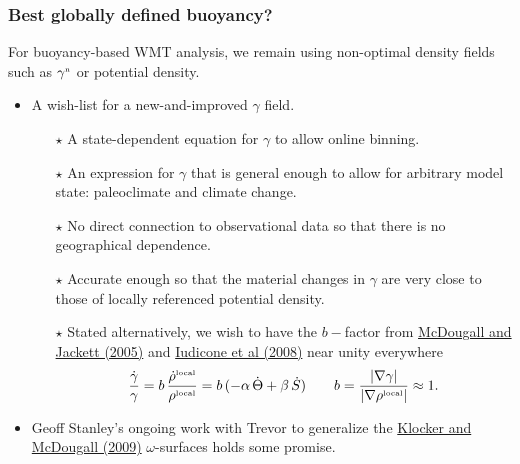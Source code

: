 \documentclass[10pt]{beamer}
\begin{document}
\begin{frame}
  \frametitle{Best globally defined buoyancy?}

  For buoyancy-based WMT analysis, we remain using non-optimal density
  fields such as $\gamma^{\mbox{\tiny n}}$ or potential density.

\begin{exampleblock}{}
\begin{itemize}

\item A wish-list for a new-and-improved $\gamma$ field.


\begin{itemize}  \footnotesize 
\item[$\star$] A state-dependent equation for $\gamma$ to allow online
  binning.

\item[$\star$] An expression for $\gamma$ that is general enough to
  allow for arbitrary model state: paleoclimate and climate change.

\item[$\star$] No direct connection to observational data so that
  there is no geographical dependence.

\item[$\star$] Accurate enough so that the material changes in
  $\gamma$ are very close to those of locally referenced potential
  density. 

\item[$\star$] Stated alternatively, we wish to have the $b-$factor
  from \href{https://doi.org/10.1357/0022240053693734}{McDougall and
    Jackett (2005)} and
  \href{https://journals.ametsoc.org/doi/10.1175/2007JPO3464.1}{Iudicone
    et al (2008)} near unity everywhere
\begin{equation}
   \frac{\dot{\gamma}}{\gamma} = b \, \frac{\dot{\rho}^{\mbox{\tiny local}}}{\rho^{\mbox{\tiny local}} }
   = b \, (-\alpha \, \dot{\Theta} + \beta \, \dot{S})  
  \qquad b = \frac{ | \nabla \gamma| }{ | \nabla \rho^{\mbox{\tiny local}} | } 
  \approx 1.
\end{equation}

\end{itemize}

\item Geoff Stanley's ongoing work with Trevor to generalize the
  \href{https://www.ocean-sci.net/5/155/2009/}{Klocker and McDougall
    (2009)} $\omega$-surfaces holds some promise.

\end{itemize}
\end{exampleblock}{}

\end{frame}
\end{document}
